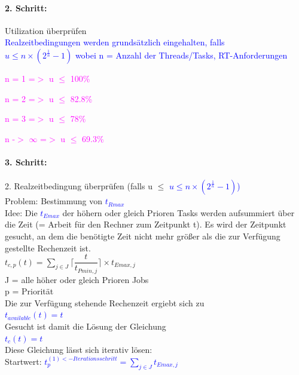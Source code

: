 \documentclass[12pt,a4paper,oneside,ngerman]{article}
\begin{document}
\paragraph{2. Schritt:}
Utilization überprüfen\\
\textcolor{blue}{Realzeitbedingungen werden grundsätzlich eingehalten, falls}\\

\textcolor{blue}{\(u \leq n\times( 2^\frac{1}{n} - 1)\) wobei n = Anzahl der Threads/Tasks, RT-Anforderungen}
\begin{description}
	\item \textcolor{magenta}{n = 1 =$>$ u \(\leq\) 100\%}
	\item \textcolor{magenta}{n = 2 =$>$ u \(\leq\) 82.8\%}
	\item \textcolor{magenta}{n = 3 =$>$ u \(\leq\) 78\%}
	\item \textcolor{magenta}{n -$>$ $\infty$ =$>$ u \(\leq\) 69.3\%}
\end{description}

\paragraph{3. Schritt:}
2. Realzeitbedingung überprüfen (falls u $\leq$ \textcolor{blue}{\(u \leq n\times( 2^\frac{1}{n} - 1)\))}\\
Problem: Bestimmung von \textcolor{blue}{\(t_{Rmax}\)} \\
Idee: Die \textcolor{blue}{\(t_{Emax}\)} der höhern oder gleich Prioren Tasks werden aufsummiert über die Zeit (= Arbeit für den Rechner zum Zeitpunkt t).
Es wird der Zeitpunkt gesucht, an dem die benötigte Zeit nicht mehr größer als die zur Verfügung gestellte Rechenzeit ist.\\

\( t_{c,p}(t) = \displaystyle\sum_{j \in J} \Big\lceil \dfrac{t}{ t_{Pmin,j} } \Big\rceil \times t_{Emax,j} \)\\
J = alle höher oder gleich Prioren Jobs\\
p = Priorität\\

Die zur Verfügung stehende Rechenzeit ergiebt sich zu \\
\textcolor{blue}{\( t_{available}(t) = t \)}\\
Gesucht ist damit die Lösung der Gleichung\\
\textcolor{blue}{\( t_c(t) = t \)}\\
Diese Gleichung lässt sich iterativ lösen:\\
Startwert: \textcolor{blue}{ \(t_{p}^{(1)<-Iterationsschritt} = \displaystyle\sum_{j \in J} t_{Emax,j} \)}\\
\end{document}
